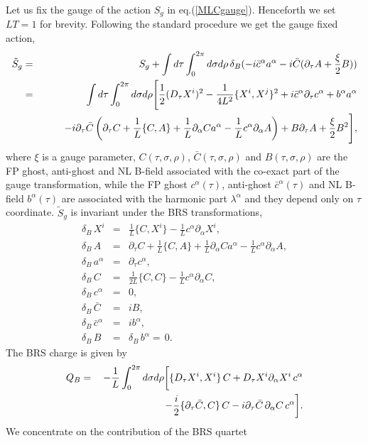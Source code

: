 \documentclass[12pt,a4paper]{article}
\newcommand{\nn}{\nonumber\\}
\newcommand{\ptau}{\partial_\tau}
\newcommand{\brs}{\delta_B}
\newcommand{\p}{\partial}
\begin{document}
Let us fix the gauge of the action $S_g$ in eq.(\ref{MLCgauge}).
Henceforth we set $LT=1$ for brevity. Following the standard procedure
\cite{KU} we get the gauge fixed action,
\begin{eqnarray}
  \tilde{S}_g&=& S_g +  \int d\tau \int_0^{2\pi}d\sigma d\rho
	\, \brs(-i\bar{c}^\alpha a^\alpha
	-i\bar{C}(\ptau A+\frac{\xi}{2}B) ) \nn
  &=&\int d\tau \int_0^{2\pi}d\sigma d\rho\Biggl[
    \frac{1}{2}(D_{\tau} X^i)^2-\frac{1}{4L^2}\{X^{i},X^{j}\}^2
    +i\bar{c}^{\alpha}\ptau c^{\alpha} +b^{\alpha}a^{\alpha}\nn
  && \hspace{5ex}- i\ptau\bar{C}\left(\ptau C +\frac{1}{L}\{C,A\}
    +\frac{1}{L}\p_{\alpha}C a^{\alpha}
    -\frac{1}{L}c^{\alpha}\p_{\alpha}A\right)+ B\ptau A
	+\frac{\xi}{2}B^2 \Biggr],\label{MLCgauge2}
\end{eqnarray}
where $\xi$ is a gauge parameter, $C(\tau,\sigma,\rho)$,
$\bar{C}(\tau,\sigma,\rho)$ and $B(\tau,\sigma,\rho)$ are the FP
ghost, anti-ghost and NL B-field associated with the co-exact
part of the gauge transformation, while the FP ghost
$c^{\alpha}(\tau)$, anti-ghost $\bar{c}^{\alpha}(\tau)$ and
NL B-field $b^{\alpha}(\tau)$ are associated with the harmonic part
$\lambda^{\alpha}$ and they depend only on $\tau$ coordinate.
$\tilde{S}_g$ is invariant under the BRS transformations,
\begin{eqnarray}
  \brs\,X^i &=& \frac{1}{L}\{ C, X^i\}-\frac{1}{L}
	 c^{\alpha}\p_{\alpha} X^i,\\
  \brs\,A&=& \ptau C +\frac{1}{L}\{ C, A\}
	+\frac{1}{L}\p_{\alpha}C a^{\alpha}-\frac{1}{L}
	 c^{\alpha}\p_{\alpha} A,\\
  \brs\,a^{\alpha}&=&\ptau c^{\alpha},\\
  \brs\,C&=&\frac{1}{2L}\{C,C\}
	-\frac{1}{L} c^{\alpha} \p_{\alpha}C,\\
  \brs\,c^{\alpha}&=&0,\\
  \brs\,\bar{C}&=&i B,\\
  \brs\,\bar{c}^{\alpha}&=&i b^{\alpha},\\
  \brs\,B &=& \brs\,b^{\alpha} =\,0.
\end{eqnarray}
The BRS charge is given by
\begin{eqnarray}
  Q_B&=&-\frac{1}{L}\int_0^{2\pi} d\sigma d\rho \biggl[
    \{D_{\tau}X^i,X^i\}\,C + D_{\tau}X^i\p_{\alpha}X^i\, c^{\alpha}\nn
  &&\hspace{15ex} -\frac{i}{2}\{\ptau\bar{C},C\}\,C
    -i\ptau\bar{C}\,\p_{\alpha}C\,c^{\alpha}\biggr].
\end{eqnarray}
We concentrate on the contribution of the BRS quartet
\end{document}
